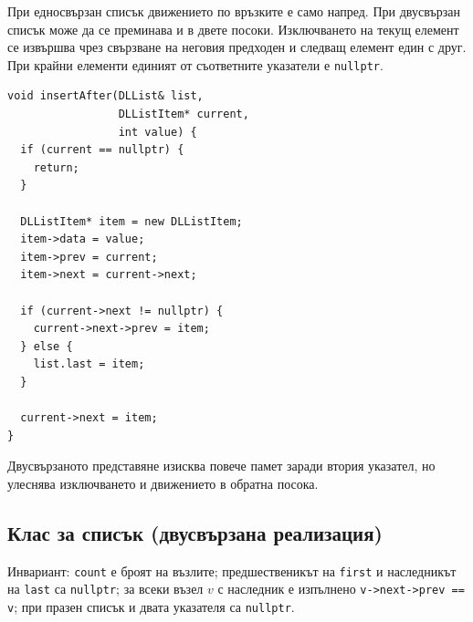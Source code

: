 При едносвързан списък движението по връзките е само напред. При двусвързан списък може да се преминава и в двете посоки. Изключването на текущ елемент се извършва чрез свързване на неговия предходен и следващ елемент един с друг. При крайни елементи единият от съответните указатели е \verb|nullptr|.

\begin{verbatim}
void insertAfter(DLList& list,
                 DLListItem* current,
                 int value) {
  if (current == nullptr) {
    return;
  }

  DLListItem* item = new DLListItem;
  item->data = value;
  item->prev = current;
  item->next = current->next;

  if (current->next != nullptr) {
    current->next->prev = item;
  } else {
    list.last = item;
  }

  current->next = item;
}
\end{verbatim}

Двусвързаното представяне изисква повече памет заради втория указател, но улеснява изключването и движението в обратна посока.


\subsection{Клас за списък (двусвързана реализация)}\label{s:18.5.3}

Инвариант: \verb|count| е броят на възлите; предшественикът на \verb|first| и
наследникът на \verb|last| са \verb|nullptr|; за всеки възел $v$ с наследник е
изпълнено \verb|v->next->prev == v|; при празен списък и двата указателя са
\verb|nullptr|.

